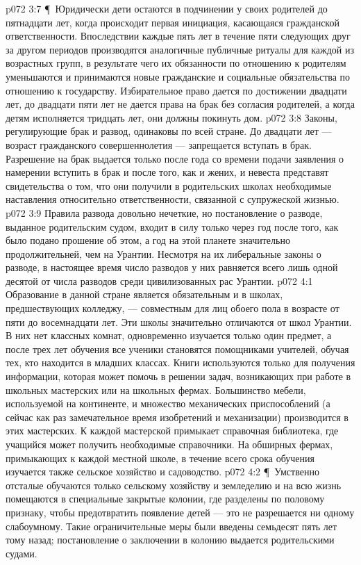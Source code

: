 \vs p072 3:7 \P\ Юридически дети остаются в подчинении у своих родителей до пятнадцати лет, когда происходит первая инициация, касающаяся гражданской ответственности. Впоследствии каждые пять лет в течение пяти следующих друг за другом периодов производятся аналогичные публичные ритуалы для каждой из возрастных групп, в результате чего их обязанности по отношению к родителям уменьшаются и принимаются новые гражданские и социальные обязательства по отношению к государству. Избирательное право дается по достижении двадцати лет, до двадцати пяти лет не дается права на брак без согласия родителей, а когда детям исполняется тридцать лет, они должны покинуть дом.
\vs p072 3:8 Законы, регулирующие брак и развод, одинаковы по всей стране. До двадцати лет --- возраст гражданского совершеннолетия --- запрещается вступать в брак. Разрешение на брак выдается только после года со времени подачи заявления о намерении вступить в брак и после того, как и жених, и невеста представят свидетельства о том, что они получили в родительских школах необходимые наставления относительно ответственности, связанной с супружеской жизнью.
\vs p072 3:9 Правила развода довольно нечеткие, но постановление о разводе, выданное родительским судом, входит в силу только через год после того, как было подано прошение об этом, а год на этой планете значительно продолжительней, чем на Урантии. Несмотря на их либеральные законы о разводе, в настоящее время число разводов у них равняется всего лишь одной десятой от числа разводов среди цивилизованных рас Урантии.
\vs p072 4:1 Образование в данной стране является обязательным и в школах, предшествующих колледжу, --- совместным для лиц обоего пола в возрасте от пяти до восемнадцати лет. Эти школы значительно отличаются от школ Урантии. В них нет классных комнат, одновременно изучается только один предмет, а после трех лет обучения все ученики становятся помощниками учителей, обучая тех, кто находится в младших классах. Книги используются только для получения информации, которая может помочь в решении задач, возникающих при работе в школьных мастерских или на школьных фермах. Большинство мебели, используемой на континенте, и множество механических приспособлений (а сейчас как раз замечательное время изобретений и механизации) производится в этих мастерских. К каждой мастерской примыкает справочная библиотека, где учащийся может получить необходимые справочники. На обширных фермах, примыкающих к каждой местной школе, в течение всего срока обучения изучается также сельское хозяйство и садоводство.
\vs p072 4:2 \P\ Умственно отсталые обучаются только сельскому хозяйству и земледелию и на всю жизнь помещаются в специальные закрытые колонии, где разделены по половому признаку, чтобы предотвратить появление детей --- это не разрешается ни одному слабоумному. Такие ограничительные меры были введены семьдесят пять лет тому назад; постановление о заключении в колонию выдается родительскими судами.
